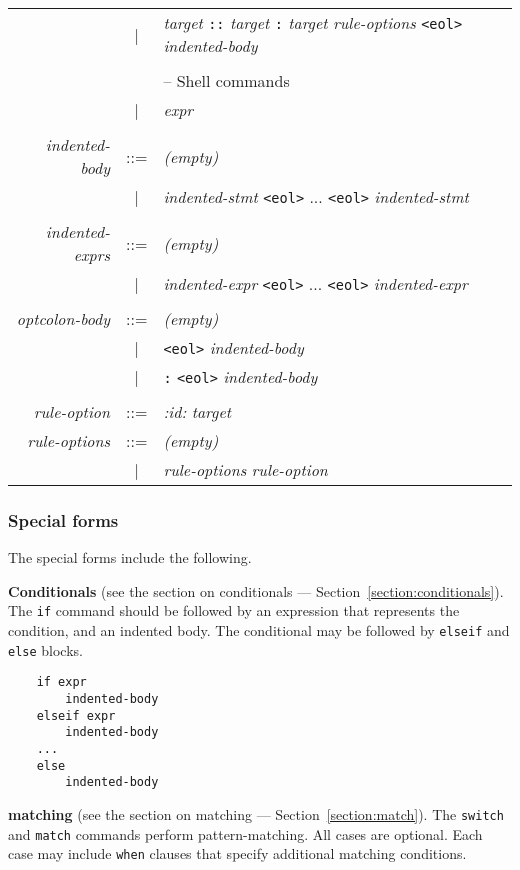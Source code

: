\begin{tabular}{rcl}
& | & \emph{target} \texttt{::} \emph{target} \texttt{:} \emph{target} \emph{rule-options} \verb+<eol>+ \emph{indented-body}\\
\\
&   & -- Shell commands\\
& | & \emph{expr}\\
\\
\emph{indented-body} & ::= & \emph{(empty)}\\
& | & \emph{indented-stmt} \verb+<eol>+ ... \verb+<eol>+ \emph{indented-stmt}\\
\\
\emph{indented-exprs} & ::= & \emph{(empty)}\\
& | & \emph{indented-expr} \verb+<eol>+ ... \verb+<eol>+ \emph{indented-expr}\\
\\
\emph{optcolon-body} & ::= & \emph{(empty)}\\
& | & \verb+<eol>+ \emph{indented-body}\\
& | & \texttt{:} \verb+<eol>+ \emph{indented-body}\\
\\
\emph{rule-option} & ::= & \emph{:id:} \emph{target}\\
\emph{rule-options} & ::= & \emph{(empty)}\\
& | & \emph{rule-options} \emph{rule-option}
\end{tabular}

\subsubsection{Special forms}

The special forms include the following.

%
\textbf{Conditionals} (see the section on conditionals --- Section~\ref{section:conditionals}).  The \verb+if+ command
should be followed by an expression that represents the condition, and an indented body.  The
conditional may be followed by \verb+elseif+ and \verb+else+ blocks.

\begin{verbatim}
    if expr
        indented-body
    elseif expr
        indented-body
    ...
    else
        indented-body
\end{verbatim}

%
\textbf{matching} (see the section on matching --- Section~\ref{section:match}).  The \verb+switch+ and
\verb+match+ commands perform pattern-matching.  All cases are optional.  Each case may include
\verb+when+ clauses that specify additional matching conditions.

